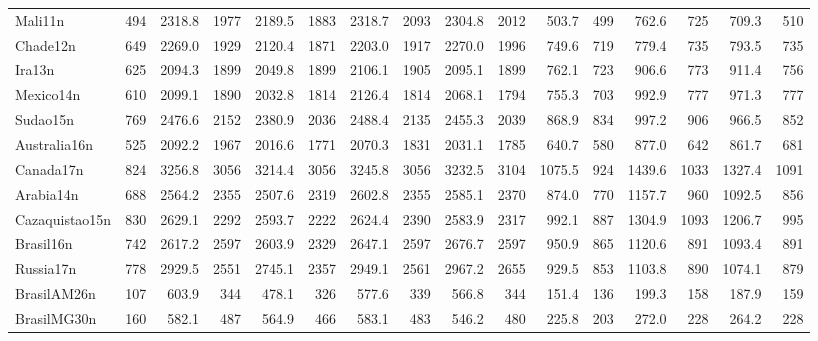 \begin{landscape}
\begin{table}[htb]
{\begin{tabular}{@{}lr|rr|rr|rr|rr|rr|rr|rr@{}}
Mali11n&494&2318.8&1977&2189.5&1883&2318.7&2093&2304.8&2012&503.7&499&762.6&725&709.3&510\\
Chade12n&649&2269.0&1929&2120.4&1871&2203.0&1917&2270.0&1996&749.6&719&779.4&735&793.5&735\\
Ira13n&625&2094.3&1899&2049.8&1899&2106.1&1905&2095.1&1899&762.1&723&906.6&773&911.4&756\\
Mexico14n&610&2099.1&1890&2032.8&1814&2126.4&1814&2068.1&1794&755.3&703&992.9&777&971.3&777\\
Sudao15n&769&2476.6&2152&2380.9&2036&2488.4&2135&2455.3&2039&868.9&834&997.2&906&966.5&852\\
Australia16n&525&2092.2&1967&2016.6&1771&2070.3&1831&2031.1&1785&640.7&580&877.0&642&861.7&681\\
Canada17n&824&3256.8&3056&3214.4&3056&3245.8&3056&3232.5&3104&1075.5&924&1439.6&1033&1327.4&1091\\
Arabia14n&688&2564.2&2355&2507.6&2319&2602.8&2355&2585.1&2370&874.0&770&1157.7&960&1092.5&856\\
Cazaquistao15n&830&2629.1&2292&2593.7&2222&2624.4&2390&2583.9&2317&992.1&887&1304.9&1093&1206.7&995\\
Brasil16n&742&2617.2&2597&2603.9&2329&2647.1&2597&2676.7&2597&950.9&865&1120.6&891&1093.4&891\\
Russia17n&778&2929.5&2551&2745.1&2357&2949.1&2561&2967.2&2655&929.5&853&1103.8&890&1074.1&879\\
BrasilAM26n&107&603.9&344&478.1&326&577.6&339&566.8&344&151.4&136&199.3&158&187.9&159\\
BrasilMG30n&160&582.1&487&564.9&466&583.1&483&546.2&480&225.8&203&272.0&228&264.2&228\\
\bottomrule
\end{tabular}
}
\end{table}
\end{landscape}
